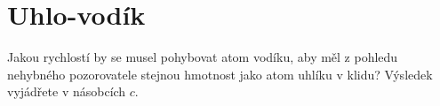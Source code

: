 \documentclass[crop=false]{standalone}
\begin{document}
\section*{Uhlo-vodík}
Jakou rychlostí by se musel pohybovat atom vodíku, aby měl z pohledu nehybného pozorovatele stejnou hmotnost jako atom uhlíku v klidu? Výsledek vyjádřete v násobcích $c$.
\end{document}
